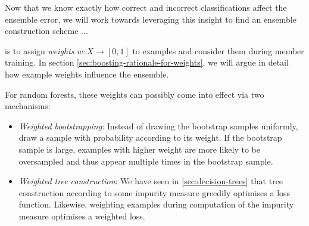 \documentclass[../main.tex]{subfiles}
\begin{document}
Now that we know exactly how correct and incorrect classifications affect the ensemble error, we will work towards leveraging this insight to find an ensemble construction scheme ...

is to assign \textit{weights} $w: X \to [0,1]$ to examples and consider them during member training. 
In section \ref{sec:boosting-rationale-for-weights}, we will argue in detail how example weights influence the ensemble. %

For random forests, these weights can possibly come into effect via two mechanisms:
\begin{itemize}
    \item \textit{Weighted bootstrapping}: Instead of drawing the bootstrap samples uniformly, draw a sample with probability according to its weight. If the bootstrap sample is large, examples with higher weight are more likely to be oversampled and thus appear multiple times in the bootstrap sample. 
    \item \textit{Weighted tree construction}: We have seen in \ref{sec:decision-trees} that tree construction according to some impurity measure greedily optimises a loss function. Likewise, weighting examples during computation of the impurity measure optimises a weighted loss.
\end{itemize}


\end{document}

